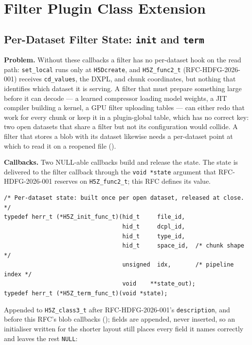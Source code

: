 \documentclass[../RFC-HDFG-2026-003.tex]{subfiles}
\begin{document}
\section{Filter Plugin Class Extension}
\label{sec:class-extension}

\subsection{Per-Dataset Filter State: \texttt{init} and \texttt{term}}
\label{sec:filter-state}

\textbf{Problem.}  Without these callbacks a filter has no per-dataset
hook on the read path: \texttt{set\_local} runs only at
\texttt{H5Dcreate}, and \texttt{H5Z\_func2\_t} (RFC-HDFG-2026-001)
receives \texttt{cd\_values}, the DXPL, and chunk coordinates, but
nothing that identifies which dataset it is serving.  A filter that must
prepare something large before it can decode --- a learned compressor
loading model weights, a JIT compiler building a kernel, a GPU filter
uploading tables --- can either redo that work for every chunk or keep it
in a plugin-global table, which has no correct key: two open datasets
that share a filter but not its configuration would collide.  A filter
that stores a blob with its dataset likewise needs a per-dataset point at
which to read it on a reopened file ().

\textbf{Callbacks.}  Two NULL-able callbacks build and release the state.
The state is delivered to the filter callback through the
\texttt{void~*state} argument that RFC-HDFG-2026-001 reserves on
\texttt{H5Z\_func2\_t}; this RFC defines its value.

\begin{verbatim}
/* Per-dataset state: built once per open dataset, released at close. */
typedef herr_t (*H5Z_init_func_t)(hid_t     file_id,
                                  hid_t     dcpl_id,
                                  hid_t     type_id,
                                  hid_t     space_id,  /* chunk shape */
                                  unsigned  idx,       /* pipeline index */
                                  void    **state_out);
typedef herr_t (*H5Z_term_func_t)(void *state);
\end{verbatim}

\noindent Appended to \texttt{H5Z\_class3\_t} after RFC-HDFG-2026-001's
\texttt{description}, and before this RFC's blob callbacks
(); fields are appended, never inserted,
so an initialiser written for the shorter layout still places every field
it names correctly and leaves the rest \texttt{NULL}:
\end{document}
